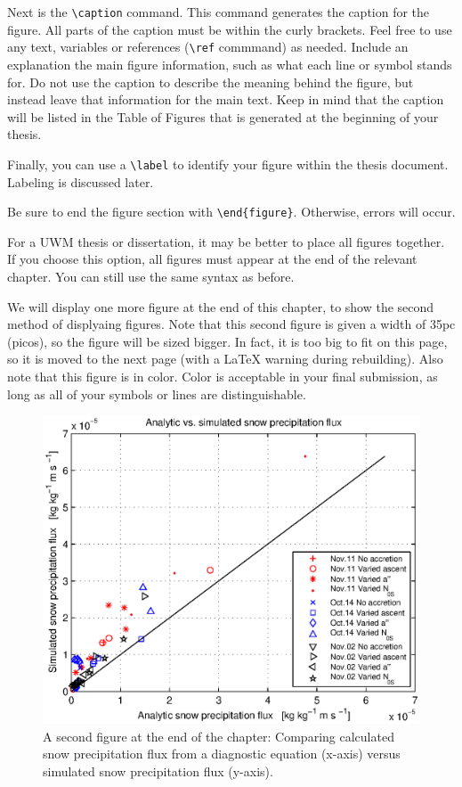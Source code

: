 \documentclass[master]{UWMThesis}
\begin{document}
Next is the \verb=\caption= command.  This command generates the caption for the figure.  All parts of the caption must be within the curly brackets.  Feel free to use any text, variables or references (\verb=\ref= commmand) as needed.  Include an explanation the main figure information, such as what each line or symbol stands for.  Do not use the caption to describe the meaning behind the figure, but instead leave that information for the main text.  Keep in mind that the caption will be listed in the Table of Figures that is generated at the beginning of your thesis.

Finally, you can use a \verb=\label= to identify your figure within the thesis document.  Labeling is discussed later.

Be sure to end the figure section with \verb=\end{figure}=.  Otherwise, errors will occur.


For a UWM thesis or dissertation, it may be better to place all figures together.  If you choose this option, all figures must appear at the end of the relevant chapter.  You can still use the same syntax as before.

We will display one more figure at the end of this chapter, to show the second method of displyaing figures.  Note that this second figure is given a width of 35pc (picos), so the figure will be sized bigger.  In fact, it is too big to fit on this page, so it is moved to the next page (with a LaTeX warning during rebuilding). Also note that this figure is in color.  Color is acceptable in your final submission, as long as all of your symbols or lines are distinguishable.

\begin{figure}[ht]
 \centering
 \noindent\includegraphics[width=35pc]{scatter_eqn23_F_psdep.eps}
 \caption{A second figure at the end of the chapter: Comparing calculated snow precipitation flux from a diagnostic equation (x-axis) versus simulated snow precipitation flux (y-axis).} 
                             \label{fig:scatter_F_psdep}
\end{figure}
\end{document}
